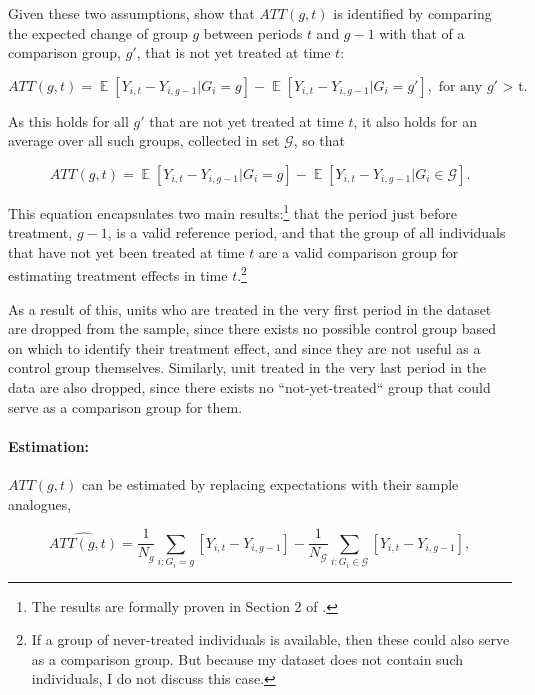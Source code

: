 Given these two assumptions, \citet{callaway2021difference} show that
$ATT(g,t)$ is identified by comparing the expected change of group $g$ between
periods $t$ and $g-1$ with that of a comparison group, $g'$, that is not yet
treated at time $t$:

\begin{equation}
    ATT(g,t) = \mathop{\mathbb{E}}[Y_{i,t} - Y_{i,g-1}|G_i = g] -
    \mathop{\mathbb{E}}[Y_{i,t} - Y_{i,g-1}|G_i = g'], \text{ for any $g'$ >
    t}.
\end{equation}

As this holds for all $g'$ that are not yet treated at time $t$, it also holds
for an average over all such groups, collected in set $\mathcal{G}$, so that

\begin{equation}
    ATT(g,t) = \mathop{\mathbb{E}}[Y_{i,t} - Y_{i,g-1}|G_i = g] -
    \mathop{\mathbb{E}}[Y_{i,t} - Y_{i,g-1}|G_i \in \mathcal{G}].
\end{equation}

This equation encapsulates two main results:\footnote{The results are formally
proven in Section 2 of \citet{callaway2021difference}.} that the period just before
treatment, $g-1$, is a valid reference period, and that the group of all
individuals that have not yet been treated at time $t$ are a valid comparison
group for estimating treatment effects in time $t$.\footnote{If a group of
never-treated individuals is available, then these could also serve as a
comparison group. But because my dataset does not contain such individuals, I
do not discuss this case.}

As a result of this, units who are treated in the very first period in the
dataset are dropped from the sample, since there exists no possible control
group based on which to identify their treatment effect, and since they are not
useful as a control group themselves. Similarly, unit treated in the very last
period in the data are also dropped, since there exists no ``not-yet-treated``
group that could serve as a comparison group for them.


\paragraph{Estimation:}%
\label{par:estimation_}

$ATT(g,t)$ can be estimated by replacing expectations with their sample
analogues,

\begin{equation}
    \widehat{ATT(g,t)} = \frac{1}{N_g}\sum_{i:G_i=g}[Y_{i,t} - Y_{i, g-1}] -
    \frac{1}{N_\mathcal{G}}\sum_{i:G_i \in \mathcal{G}}[Y_{i,t} - Y_{i, g-1}],
\end{equation}

